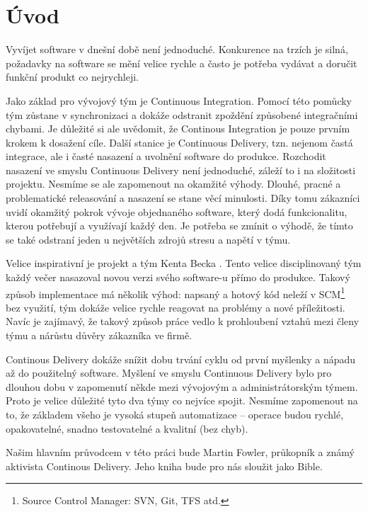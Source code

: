 
\chapter{Úvod}
Vyvíjet software v dnešní době není jednoduché. Konkurence na trzích je silná, požadavky na software se mění velice rychle a často je potřeba vydávat a doručit funkční produkt co nejrychleji.

Jako základ pro vývojový tým je Continuous Integration. Pomocí této pomůcky tým zůstane v synchronizaci a dokáže odstranit zpoždění způsobené integračními chybami. Je důležité si ale uvědomit, že Continous Integration je pouze prvním krokem k dosažení cíle. Další stanice je Continuous Delivery, tzn. nejenom častá integrace, ale i časté nasazení a uvolnění software do produkce. Rozchodit nasazení ve smyslu Continuous Delivery není jednoduché, záleží to i na složitosti projektu. Nesmíme se ale zapomenout na okamžité výhody. Dlouhé, pracné a problematické releasování a nasazení se stane věcí minulosti. Díky tomu zákazníci uvidí okamžitý pokrok vývoje objednaného software, který dodá funkcionalitu, kterou potřebují a využívají každý den. Je potřeba se zmínit o výhodě, že tímto se také odstraní jeden u největších zdrojů stresu a napětí v týmu.

Velice inspirativní je projekt a tým Kenta Becka \cite{ContDelivery}. Tento velice disciplinovaný tým každý večer nasazoval novou verzi svého software-u přímo do produkce. Takový způsob implementace má několik výhod: napsaný a hotový kód neleží v SCM\footnote{Source Control Manager: SVN, Git, TFS atd.} bez využití, tým dokáže velice rychle reagovat na problémy a nové příležitosti. Navíc je zajímavý, že takový způsob práce vedlo k prohloubení vztahů mezi členy týmu a nárůstu důvěry zákazníka ve firmě. 

Continous Delivery dokáže snížit dobu trvání cyklu od první myšlenky a nápadu až do použitelný software. Myšlení ve smyslu Continuous Delivery bylo pro dlouhou dobu v zapomenutí někde mezi vývojovým a administrátorským týmem. Proto je velice důležité tyto dva týmy co nejvíce spojit. Nesmíme zapomenout na to, že základem všeho je vysoká stupeň automatizace -- operace budou rychlé, opakovatelné, snadno testovatelné a kvalitní (bez chyb).

Našim hlavním průvodcem v této práci bude Martin Fowler, průkopník a známý aktivista Continous Delivery. Jeho kniha \cite{ContDelivery}
bude pro nás sloužit jako Bible. 

